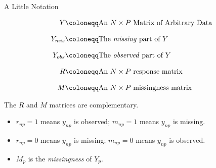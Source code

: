 \documentclass{beamer}\usepackage[]{graphicx}\usepackage[]{color}
\begin{document}

\begin{frame}{A Little Notation}

  \begin{align*}
    Y &\coloneqq \text{An $N \times P$ Matrix of Arbitrary Data}\\[8pt]
    Y_{mis} &\coloneqq \text{The \emph{missing} part of $Y$}\\[8pt]
    Y_{obs} &\coloneqq \text{The \emph{observed} part of $Y$}\\[8pt]
    R &\coloneqq \text{An $N \times P$ response matrix}\\[8pt]
    M &\coloneqq \text{An $N \times P$ missingness matrix}
  \end{align*}

  The $R$ and $M$ matrices are complementary.
  \begin{itemize}
  \item $r_{np} = 1$ means $y_{np}$ is observed; $m_{np} = 1$ means $y_{np}$ is
    missing.
  \item $r_{np} = 0$ means $y_{np}$ is missing; $m_{np} = 0$ means $y_{np}$ is
    observed.
  \item $M_p$ is the \emph{missingness} of $Y_p$.
  \end{itemize}

\end{frame}



\end{document}
